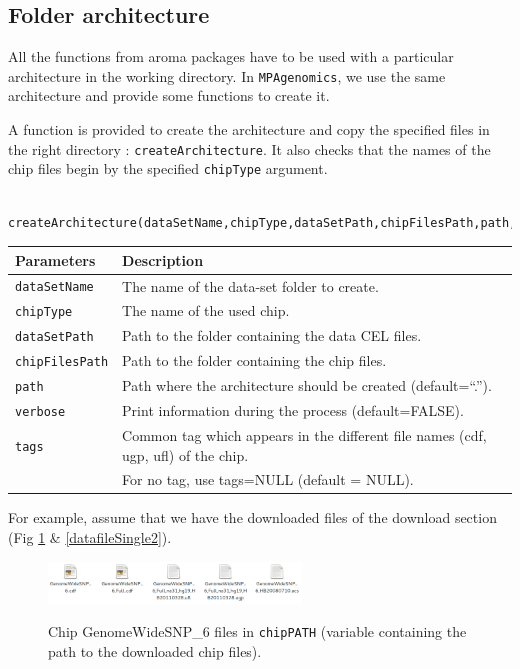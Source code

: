\documentclass[a4paper,10pt]{article}
\begin{document}
	
	\subsection{Folder architecture}\label{arch}
  
		All the functions from aroma packages have to be used with a particular architecture in the working directory. In \texttt{MPAgenomics}, we use the same architecture and provide some functions to create it.

  	A function is provided to create the architecture and copy the specified files in the right directory : \mbox{\texttt{createArchitecture}}. It also checks that the names of the chip files begin by the specified \texttt{chipType} argument.		
		
		\begin{verbatim}
	createArchitecture(dataSetName,chipType,dataSetPath,chipFilesPath,path,verbose,tags)
		\end{verbatim}
	
		\begin{center}
			\begin{tabular}{|l|l|}
				\hline
				Parameters & Description\\
				\hline
				\texttt{dataSetName} & The name of the data-set folder to create.\\
				\texttt{chipType} & The name of the used chip.\\
				\texttt{dataSetPath} &  Path to the folder containing the data CEL files.\\
				\texttt{chipFilesPath} & Path to the folder containing the chip files.\\
				\texttt{path} & Path where the architecture should be created (default=``.'').\\
				\texttt{verbose} & Print information during the process (default=FALSE).\\
        \texttt{tags} & Common tag which appears in the different file names (cdf, ugp, ufl) of the chip. \\
        ~~ & For no tag, use tags=NULL (default = NULL).\\
				\hline	
			\end{tabular}		
		\end{center}
		
		
		For example, assume that we have the downloaded files of the download section (Fig \ref{chipfile} \& \ref{datafileSingle2}).\\
		
		\begin{figure}[!h]
			\centering
			\includegraphics[width=0.6\textwidth]{fig/chipFiles2}\\
			\caption{Chip GenomeWideSNP\_6 files in \texttt{chipPATH} (variable containing the path to the downloaded chip files).}%
			\label{chipfile}
		\end{figure}
		
\end{document}
